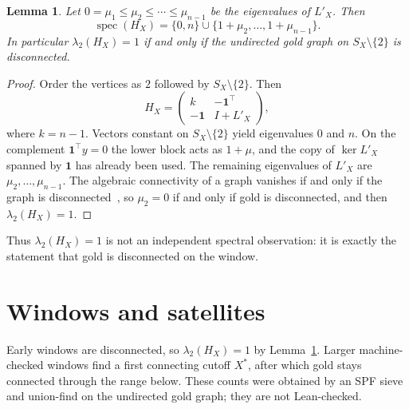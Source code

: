 \documentclass[11pt,a4paper]{article}
\newtheorem{lemma}{Lemma}
\begin{document}
\begin{lemma}
\label{lem:cone}
Let \(0=\mu_1\le\mu_2\le\cdots\le\mu_{n-1}\) be the eigenvalues of \(L'_X\).
Then
\[
\operatorname{spec}(H_X)=\{0,n\}\cup\{1+\mu_2,\dots,1+\mu_{n-1}\}.
\]
In particular \(\lambda_2(H_X)=1\) if and only if the undirected gold graph on \(S_X\setminus\{2\}\) is disconnected.
\end{lemma}

\begin{proof}
Order the vertices as \(2\) followed by \(S_X\setminus\{2\}\).
Then
\[
H_X=
\begin{pmatrix}
k & -\mathbf{1}^\top \\
-\mathbf{1} & I+L'_X
\end{pmatrix},
\]
where \(k=n-1\).
Vectors constant on \(S_X\setminus\{2\}\) yield eigenvalues \(0\) and \(n\).
On the complement \(\mathbf{1}^\top y=0\) the lower block acts as \(1+\mu\), and the copy of \(\ker L'_X\) spanned by \(\mathbf{1}\) has already been used.
The remaining eigenvalues of \(L'_X\) are \(\mu_2,\dots,\mu_{n-1}\).
The algebraic connectivity of a graph vanishes if and only if the graph is disconnected~\cite{Fiedler}, so \(\mu_2=0\) if and only if gold is disconnected, and then \(\lambda_2(H_X)=1\).
\end{proof}

Thus \(\lambda_2(H_X)=1\) is not an independent spectral observation: it is exactly the statement that gold is disconnected on the window.

\section{Windows and satellites}

Early windows are disconnected, so \(\lambda_2(H_X)=1\) by Lemma~\ref{lem:cone}.
Larger machine-checked windows find a first connecting cutoff \(X^*\), after which gold stays connected through the range below.
These counts were obtained by an SPF sieve and union-find on the undirected gold graph; they are not Lean-checked.
\end{document}
